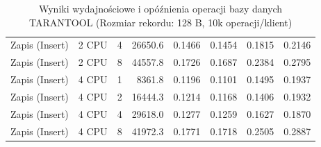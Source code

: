 \begin{table}[ht]
{\begin{tabular}{llcrrrrr}
Zapis (Insert) & 2 CPU & 4 & 26650.6 & 0.1466 & 0.1454 & 0.1815 & 0.2146 \\
Zapis (Insert) & 2 CPU & 8 & 44557.8 & 0.1726 & 0.1687 & 0.2384 & 0.2795 \\
Zapis (Insert) & 4 CPU & 1 & 8361.8 & 0.1196 & 0.1101 & 0.1495 & 0.1937 \\
Zapis (Insert) & 4 CPU & 2 & 16444.3 & 0.1214 & 0.1168 & 0.1406 & 0.1932 \\
Zapis (Insert) & 4 CPU & 4 & 29618.0 & 0.1277 & 0.1259 & 0.1627 & 0.1870 \\
Zapis (Insert) & 4 CPU & 8 & 41972.3 & 0.1771 & 0.1718 & 0.2505 & 0.2887 \\
\bottomrule
\end{tabular}%
}
\caption{Wyniki wydajnościowe i opóźnienia operacji bazy danych TARANTOOL (Rozmiar rekordu: 128 B, 10k operacji/klient)}
\label{tab:latency_tarantool_small_10000}
\end{table}
